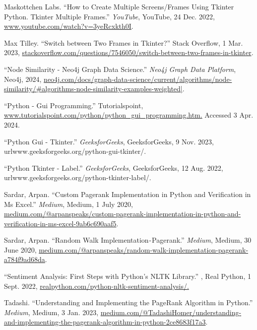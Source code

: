\documentclass[fontsize=11pt]{article}
\begin{document}
\par Maskottchen Labs. “How to Create Multiple Screens/Frames Using Tkinter Python. Tkinter Multiple Frames.” \textit{YouTube}, YouTube, 24 Dec. 2022, \url{www.youtube.com/watch?v=3yeRcxkth0I}.

\par Max Tilley. “Switch between Two Frames in Tkinter?” Stack Overflow, 1 Mar. 2023, \url{stackoverflow.com/questions/7546050/switch-between-two-frames-in-tkinter}.

\par “Node Similarity - Neo4j Graph Data Science.” \textit{Neo4j Graph Data Platform}, Neo4j, 2024, \url{neo4j.com/docs/graph-data-science/current/algorithms/node-similarity/#algorithms-node-similarity-examples-weighted|}.

\par “Python - Gui Programming.” Tutorialspoint, \url{www.tutorialspoint.com/python/python_gui_programming.htm.} Accessed 3 Apr. 2024.

\par “Python Gui - Tkinter.” \textit{GeeksforGeeks}, GeeksforGeeks, 9 Nov. 2023, 
url{www.geeksforgeeks.org/python-gui-tkinter/}.

\par “Python Tkinter - Label.” \textit{GeeksforGeeks}, GeeksforGeeks, 12 Aug. 2022, 
url{www.geeksforgeeks.org/python-tkinter-label/}.

\par Sardar, Arpan. “Custom Pagerank Implementation in Python and Verification in Ms Excel.” \textit{Medium}, Medium, 1 July 2020, 
\\\url{medium.com/@arpanspeaks/custom-pagerank-implementation-in-python-and-verification-in-ms-excel-9ab6c690aaf5}.

\par Sardar, Arpan. “Random Walk Implementation - Pagerank.” \textit{Medium}, Medium, 30 June 2020,
\url{medium.com/@arpanspeaks/random-walk-implementation-pagerank-a784f9ad68da}.

\par “Sentiment Analysis: First Steps with Python’s NLTK Library.” , Real Python, 1 Sept. 2022, \url{realpython.com/python-nltk-sentiment-analysis/.}

\par Tadashi. “Understanding and Implementing the PageRank Algorithm in Python.” \textit{Medium}, Medium, 3 Jan. 2023, \url{medium.com/@TadashiHomer/understanding-and-implementing-the-pagerank-algorithm-in-python-2ce8683f17a3}.
\end{document}

